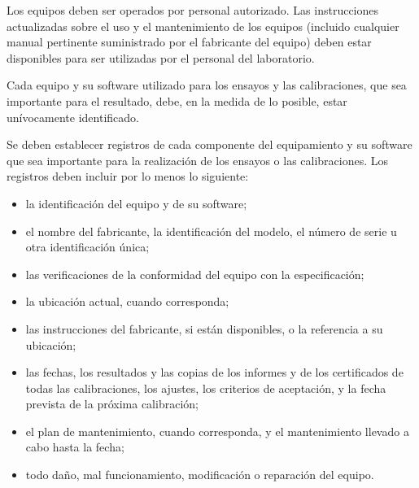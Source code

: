 			\par \noindent
				Los equipos deben ser operados por personal autorizado. Las instrucciones actualizadas sobre el
				uso y el mantenimiento de los equipos (incluido cualquier manual pertinente suministrado por el fabricante del
				equipo) deben estar disponibles para ser utilizadas por el personal del laboratorio.
				
			\par \noindent
				Cada equipo y su software utilizado para los ensayos y las calibraciones, que sea importante para el
				resultado, debe, en la medida de lo posible, estar unívocamente identificado.
				
			\par \noindent
				Se deben establecer registros de cada componente del equipamiento y su software que sea
				importante para la realización de los ensayos o las calibraciones. Los registros deben incluir por lo menos lo
				siguiente:
				
			\begin{itemize}
				\item la identificación del equipo y de su software;
				
				\item el nombre del fabricante, la identificación del modelo, el número de serie u otra identificación única;
				
				\item las verificaciones de la conformidad del equipo con la especificación;
				
				\item la ubicación actual, cuando corresponda;
				
				\item las instrucciones del fabricante, si están disponibles, o la referencia a su ubicación;
				
\newpage
\thispagestyle{plain}
				
				\item las fechas, los resultados y las copias de los informes y de los certificados de todas las calibraciones, los
				ajustes, los criterios de aceptación, y la fecha prevista de la próxima calibración;
				
				\item el plan de mantenimiento, cuando corresponda, y el mantenimiento llevado a cabo hasta la fecha;
				
				\item todo daño, mal funcionamiento, modificación o reparación del equipo.
			\end{itemize}
		
